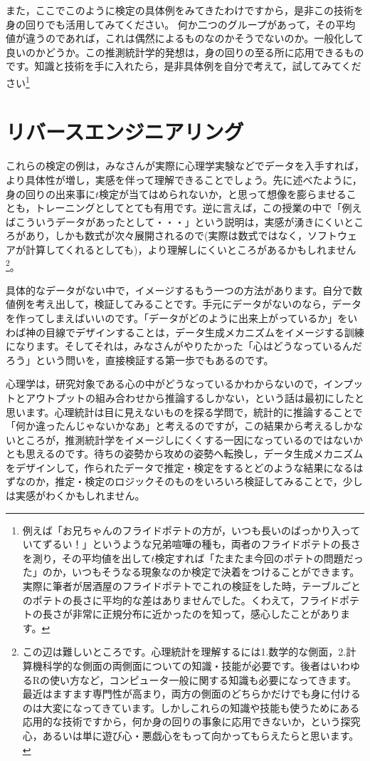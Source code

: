 \documentclass{ltjsarticle}
\begin{document}
また，ここでこのように検定の具体例をみてきたわけですから，是非この技術を身の回りでも活用してみてください。
何か二つのグループがあって，その平均値が違うのであれば，これは偶然によるものなのかそうでないのか。一般化して良いのかどうか。この推測統計学的発想は，身の回りの至る所に応用できるものです。知識と技術を手に入れたら，是非具体例を自分で考えて，試してみてください\footnote{例えば「お兄ちゃんのフライドポテトの方が，いつも長いのばっかり入っていてずるい！」というような兄弟喧嘩の種も，両者のフライドポテトの長さを測り，その平均値を出して$t$検定すれば「たまたま今回のポテトの問題だった」のか，いつもそうなる現象なのか検定で決着をつけることができます。実際に筆者が居酒屋のフライドポテトでこれの検証をした時，テーブルごとのポテトの長さに平均的な差はありませんでした。くわえて，フライドポテトの長さが非常に正規分布に近かったのを知って，感心したことがあります。}

\section{リバースエンジニアリング}
これらの検定の例は，みなさんが実際に心理学実験などでデータを入手すれば，より具体性が増し，実感を伴って理解できることでしょう。先に述べたように，身の回りの出来事に$t$検定が当てはめられないか，と思って想像を膨らませることも，トレーニングとしてとても有用です。逆に言えば，この授業の中で「例えばこういうデータがあったとして・・・」という説明は，実感が湧きにくいところがあり，しかも数式が次々展開されるので(実際は数式ではなく，ソフトウェアが計算してくれるとしても)，より理解しにくいところがあるかもしれません\footnote{この辺は難しいところです。心理統計を理解するには1.数学的な側面，2.計算機科学的な側面の両側面についての知識・技能が必要です。後者はいわゆるRの使い方など，コンピュータ一般に関する知識も必要になってきます。最近はますます専門性が高まり，両方の側面のどちらかだけでも身に付けるのは大変になってきています。しかしこれらの知識や技能も使うためにある応用的な技術ですから，何か身の回りの事象に応用できないか，という探究心，あるいは単に遊び心・悪戯心をもって向かってもらえたらと思います。}。

具体的なデータがない中で，イメージするもう一つの方法があります。自分で数値例を考え出して，検証してみることです。手元にデータがないのなら，データを作ってしまえばいいのです。「データがどのように出来上がっているか」をいわば神の目線でデザインすることは，データ生成メカニズムをイメージする訓練になります。そしてそれは，みなさんがやりたかった「心はどうなっているんだろう」という問いを，直接検証する第一歩でもあるのです。

心理学は，研究対象である心の中がどうなっているかわからないので，インプットとアウトプットの組み合わせから推論するしかない，という話は最初にしたと思います。心理統計は目に見えないものを探る学問で，統計的に推論することで「何か違ったんじゃないかなあ」と考えるのですが，この結果から考えるしかないところが，推測統計学をイメージしにくくする一因になっているのではないかとも思えるのです。待ちの姿勢から攻めの姿勢へ転換し，データ生成メカニズムをデザインして，作られたデータで推定・検定をするとどのような結果になるはずなのか，推定・検定のロジックそのものをいろいろ検証してみることで，少しは実感がわくかもしれません。
\end{document}
